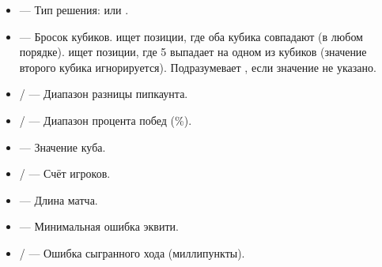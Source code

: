 \documentclass[letterpaper,10pt,russian]{sphinxmanual}
\begin{document}
\sphinxAtStartPar
{}
\begin{itemize}
\item {} 
\sphinxAtStartPar
{} — Тип решения:  или .

\item {} 
\sphinxAtStartPar
{} — Бросок кубиков.  ищет позиции, где оба кубика совпадают (в любом порядке).  ищет позиции, где 5 выпадает на одном из кубиков (значение второго кубика игнорируется). Подразумевает , если значение  не указано.

\item {} 
\sphinxAtStartPar
{} /  — Диапазон разницы пипкаунта.

\item {} 
\sphinxAtStartPar
{} /  — Диапазон процента побед (\%).

\item {} 
\sphinxAtStartPar
{} — Значение куба.

\item {} 
\sphinxAtStartPar
{} /  — Счёт игроков.

\item {} 
\sphinxAtStartPar
{} — Длина матча.

\item {} 
\sphinxAtStartPar
{} — Минимальная ошибка эквити.

\item {} 
\sphinxAtStartPar
{} /  — Ошибка сыгранного хода (миллипункты).


\end{itemize}
\end{document}
